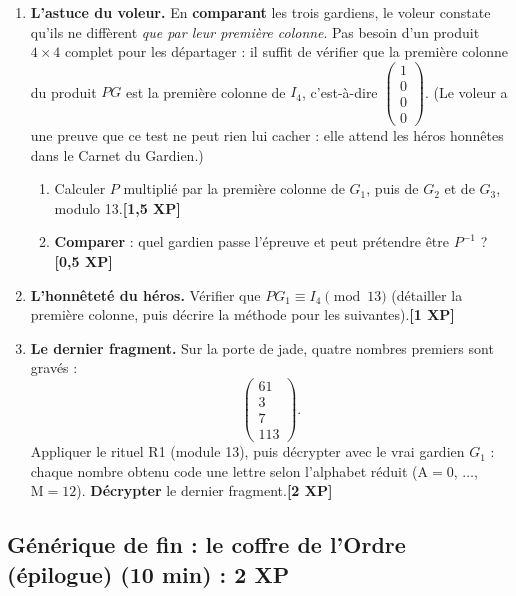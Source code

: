 \documentclass[11pt,a4paper]{article}
\newcommand{\Epx}[1]{\textcolor{or}{\textbf{[#1 XP]}}}
\begin{document}
	\begin{enumerate}[label=\textbf{C.\arabic*.},leftmargin=10mm]
		\item \textbf{L'astuce du voleur.} En \textbf{comparant} les trois
		gardiens, le voleur constate qu'ils ne diffèrent \emph{que par leur
			première colonne}. Pas besoin d'un produit $4\times 4$ complet pour
		les départager : il suffit de vérifier que la première colonne du
		produit $P G$ est la première colonne de $I_4$, c'est-à-dire
		$\begin{pmatrix}1\\0\\0\\0\end{pmatrix}$.
		(Le voleur a une preuve que ce test ne peut rien lui cacher : elle
		attend les héros honnêtes dans le Carnet du Gardien.)
		\begin{enumerate}[label=\alph*)]
			\item Calculer $P$ multiplié par la première colonne de $G_1$,
			puis de $G_2$ et de $G_3$, modulo 13.\Epx{1,5}
			\item \textbf{Comparer} : quel gardien passe l'épreuve et peut
			prétendre être $P^{-1}$ ?\Epx{0,5}
		\end{enumerate}
		\item \textbf{L'honnêteté du héros.} Vérifier que
		$P G_1 \equiv I_4 \pmod{13}$ (détailler la première colonne, puis
		décrire la méthode pour les suivantes).\Epx{1}
		\item \textbf{Le dernier fragment.} Sur la porte de jade, quatre nombres
		premiers sont gravés :
		\[
		\begin{pmatrix}61\\3\\7\\113\end{pmatrix}.
		\]
		Appliquer le rituel R1 (module 13), puis décrypter avec le vrai gardien
		$G_1$ : chaque nombre obtenu code une lettre selon l'alphabet réduit
		($\text{A}=0$, $\dots$, $\text{M}=12$). \textbf{Décrypter} le dernier
		fragment.\Epx{2}
	\end{enumerate}
	
	\subsection*{\textcolor{or}{Générique de fin : le coffre de l'Ordre (épilogue)} \normalsize\textcolor{or}{(10 min)} : 2 XP}
	
\end{document}
